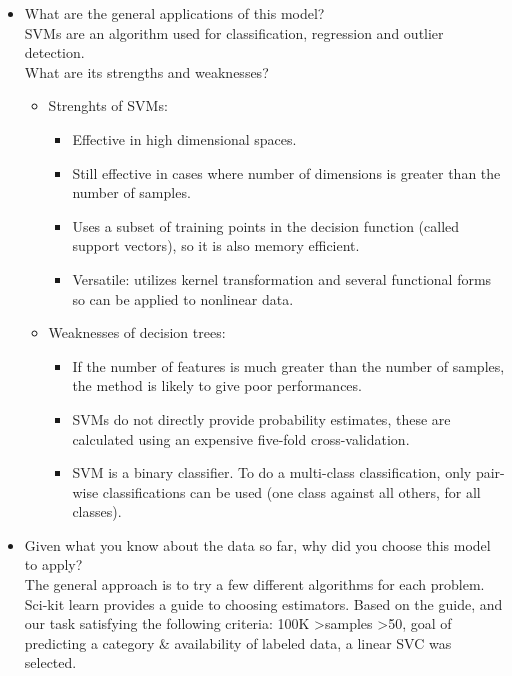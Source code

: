 \documentclass[12pt]{article}
\begin{document}
\begin{itemize}
\item What are the general applications of this model?\\ 
SVMs are an algorithm used for classification, regression and outlier detection.\\
What are its strengths and weaknesses?
\begin{itemize}
       \item Strenghts of SVMs:
              \begin{itemize}[noitemsep,nolistsep]
                     \item Effective in high dimensional spaces.
                     \item Still effective in cases where number of dimensions is greater than the number of samples.
                     \item Uses a subset of training points in the decision function (called support vectors), so it is also memory efficient.
                     \item Versatile: utilizes kernel transformation and several functional forms so can be applied to nonlinear data.
              \end{itemize}
       \item Weaknesses of decision trees:
              \begin{itemize}[noitemsep,nolistsep]
                     \item If the number of features is much greater than the number of samples, the method is likely to give poor performances.
                     \item SVMs do not directly provide probability estimates, these are calculated using an expensive five-fold cross-validation.
                     \item SVM is a binary classifier. To do a multi-class classification, only pair-wise classifications can be used (one class against all others, for all classes).
              \end{itemize}
       \end{itemize}

\item Given what you know about the data so far, why did you choose this model to apply?\\
The general approach is to try a few different algorithms for each problem. Sci-kit learn provides a guide to choosing estimators. Based on the guide, and our task satisfying the following criteria: {100K \textgreater samples \textgreater 50, goal of predicting a category \& availability of labeled data}, a linear SVC was selected. 
\end{itemize}
\end{document}
